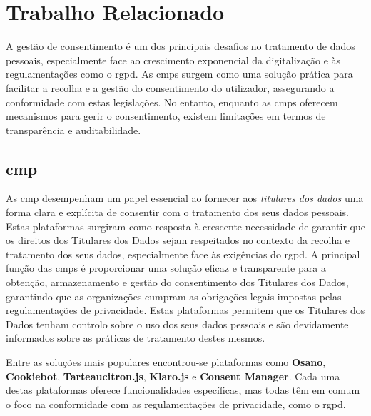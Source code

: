 \chapter{Trabalho Relacionado}
\label{cap:relacionado}

A gestão de consentimento é um dos principais desafios no tratamento de dados pessoais, especialmente face ao crescimento exponencial da digitalização e às regulamentações como o \acrshort{rgpd}. 
As \acrshort{cmp}s surgem como uma solução prática para facilitar a recolha e a gestão do consentimento do utilizador, assegurando a conformidade com estas legislações. No entanto, enquanto as \acrshort{cmp}s oferecem mecanismos para gerir o consentimento, existem limitações em termos de transparência e auditabilidade.


\section{\texorpdfstring{\acrfull{cmp}}{CMP}}

As \acrfull{cmp} desempenham um papel essencial ao fornecer aos \textit{titulares dos dados} uma forma clara e explícita de consentir com o tratamento dos seus dados pessoais. Estas plataformas surgiram como resposta à crescente necessidade de garantir que os direitos dos Titulares dos Dados sejam respeitados no contexto da recolha e tratamento dos seus dados, especialmente face às exigências do \acrshort{rgpd}. A principal função das \acrshort{cmp}s é proporcionar uma solução eficaz e transparente para a obtenção, armazenamento e gestão do consentimento dos Titulares dos Dados, garantindo que as organizações cumpram as obrigações legais impostas pelas regulamentações de privacidade. Estas plataformas permitem que os Titulares dos Dados tenham controlo sobre o uso dos seus dados pessoais e são devidamente informados sobre as práticas de tratamento destes mesmos.

Entre as soluções mais populares encontrou-se plataformas como \textbf{Osano}, \textbf{Cookiebot}, \textbf{Tarteaucitron.js}, \textbf{Klaro.js} e \textbf{Consent Manager}. Cada uma destas plataformas oferece funcionalidades específicas, mas todas têm em comum o foco na conformidade com as regulamentações de privacidade, como o \acrshort{rgpd}.

